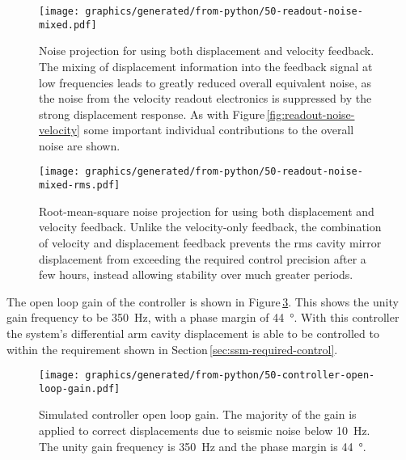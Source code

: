 \begin{figure}
  \centering
  \texttt{[image: graphics/generated/from-python/50-readout-noise-mixed.pdf]}
  \caption[Noise projection for \LMINUS{} using both displacement and velocity feedback]{\label{fig:readout-noise-mixed}Noise projection for \LMINUS{} using both displacement and velocity feedback. The mixing of displacement information into the feedback signal at low frequencies leads to greatly reduced overall equivalent \LMINUS{} noise, as the noise from the velocity readout electronics is suppressed by the strong displacement response. As with Figure\,\ref{fig:readout-noise-velocity} some important individual contributions to the overall noise are shown.}
\end{figure}

\begin{figure}
  \centering
  \texttt{[image: graphics/generated/from-python/50-readout-noise-mixed-rms.pdf]}
  \caption[Root-mean-square noise projection for \LMINUS{} using both displacement and velocity feedback]{\label{fig:readout-noise-mixed-rms}Root-mean-square noise projection for \LMINUS{} using both displacement and velocity feedback. Unlike the velocity-only feedback, the combination of velocity and displacement feedback prevents the rms cavity mirror displacement from exceeding the required control precision after a few hours, instead allowing stability over much greater periods.}
\end{figure}

The open loop gain of the controller is shown in Figure\,\ref{fig:open-loop-gain}. This shows the unity gain frequency to be \SI{350}{\hertz}, with a phase margin of \SI{44}{\degree}. With this controller the system's differential arm cavity displacement is able to be controlled to within the requirement shown in Section\,\ref{sec:ssm-required-control}.

\begin{figure}
  \texttt{[image: graphics/generated/from-python/50-controller-open-loop-gain.pdf]}
  \caption[Simulated controller open loop gain]{\label{fig:open-loop-gain}Simulated \SSM{} controller open loop gain. The majority of the gain is applied to correct displacements due to seismic noise below \SI{10}{\hertz}. The unity gain frequency is \SI{350}{\hertz} and the phase margin is \SI{44}{\degree}.}
\end{figure}

